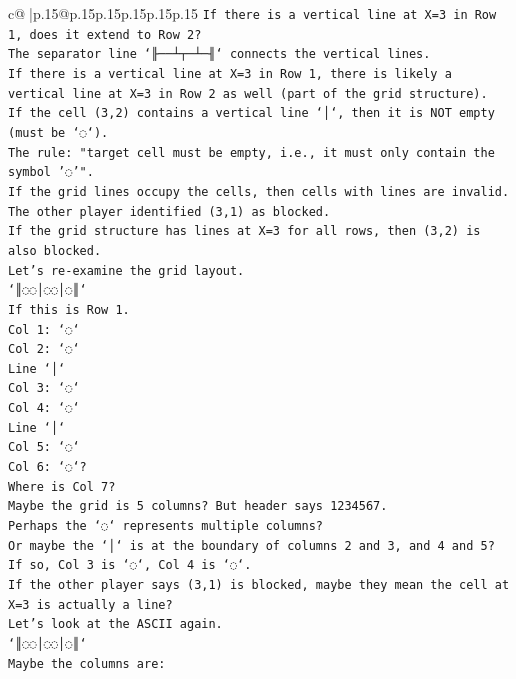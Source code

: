 \documentclass{article}
\begin{document}
{\begin{supertabular}{c@{$\;$}|p{.15\linewidth}@{}p{.15\linewidth}p{.15\linewidth}p{.15\linewidth}p{.15\linewidth}p{.15\linewidth}}
{{{\texttt{If there is a vertical line at X=3 in Row 1, does it extend to Row 2?} \\
\texttt{The separator line `╟──┴┬─┴─╢` connects the vertical lines.} \\
\texttt{If there is a vertical line at X=3 in Row 1, there is likely a vertical line at X=3 in Row 2 as well (part of the grid structure).} \\
\texttt{If the cell (3,2) contains a vertical line `│`, then it is NOT empty (must be `◌`).} \\
\texttt{The rule: "target cell must be empty, i.e., it must only contain the symbol '◌'".} \\
\texttt{If the grid lines occupy the cells, then cells with lines are invalid.} \\
\texttt{The other player identified (3,1) as blocked.} \\
\texttt{If the grid structure has lines at X=3 for all rows, then (3,2) is also blocked.} \\
\texttt{Let's re{-}examine the grid layout.} \\
\texttt{`║◌◌│◌◌│◌║`} \\
\texttt{If this is Row 1.} \\
\texttt{Col 1: `◌`} \\
\texttt{Col 2: `◌`} \\
\texttt{Line `│`} \\
\texttt{Col 3: `◌`} \\
\texttt{Col 4: `◌`} \\
\texttt{Line `│`} \\
\texttt{Col 5: `◌`} \\
\texttt{Col 6: `◌`?} \\
\texttt{Where is Col 7?} \\
\texttt{Maybe the grid is 5 columns? But header says 1234567.} \\
\texttt{Perhaps the `◌` represents multiple columns?} \\
\texttt{Or maybe the `│` is at the boundary of columns 2 and 3, and 4 and 5?} \\
\texttt{If so, Col 3 is `◌`, Col 4 is `◌`.} \\
\texttt{If the other player says (3,1) is blocked, maybe they mean the cell at X=3 is actually a line?} \\
\texttt{Let's look at the ASCII again.} \\
\texttt{`║◌◌│◌◌│◌║`} \\
\texttt{Maybe the columns are:} \\
}}}
\end{supertabular}}
\end{document}
